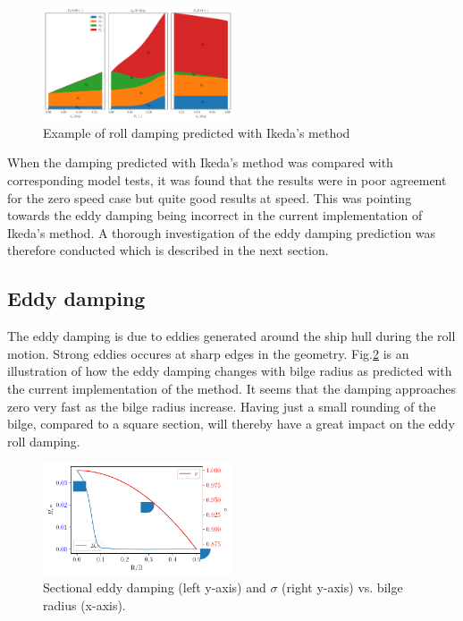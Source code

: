     

    \begin{figure}[H]
        \begin{center}\includegraphics[width = 0.5\textwidth]{figures/ikeda_generic.pdf}\end{center}
        \vspace{-1cm}
        \caption{Example of roll damping predicted with Ikeda's method}
        \label{fig:ikeda_generic}
    \end{figure}
    
    When the damping predicted with Ikeda's method was compared with
corresponding model tests, it was found that the results were in poor
agreement for the zero speed case but quite good results at speed. This
was pointing towards the eddy damping being incorrect in the current
implementation of Ikeda's method. A thorough investigation of the eddy
damping prediction was therefore conducted which is described in the
next section.

    \subsection*{Eddy damping}\label{eddy-damping}

The eddy damping is due to eddies generated around the ship hull during
the roll motion. Strong eddies occures at sharp edges in the geometry.
Fig.\ref{fig:eddy_sigma} is an illustration of how the eddy
damping changes with bilge radius as predicted with the current
implementation of the method. It seems that the damping approaches zero
very fast as the bilge radius increase. Having just a small rounding of
the bilge, compared to a square section, will thereby have a great
impact on the eddy roll damping.

    

    \begin{figure}[H]
        \begin{center}\includegraphics[width = 0.5\textwidth]{figures/eddy_sigma.pdf}\end{center}
        \vspace{-1cm}
        \caption{Sectional eddy damping (left y-axis) and $\sigma$ (right y-axis) vs. bilge radius (x-axis).}
        \label{fig:eddy_sigma}
    \end{figure}
    
